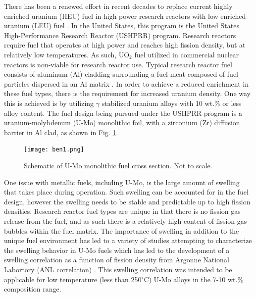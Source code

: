 \documentclass[review]{elsarticle}
\begin{document}
There has been a renewed effort in recent decades to replace current highly enriched uranium (HEU) fuel in high power research reactors with low enriched uranium (LEU) fuel \cite{snelgrove1997}. In the United States, this program is the United States High-Performance Research Reactor (USHPRR) program. Research reactors require fuel that operates at high power and reaches high fission density, but at relatively low temperatures. As such, UO$_{2}$ fuel utilized in commercial nuclear reactors is non-viable for research reactor use. Typical research reactor fuel consists of aluminum (Al) cladding surrounding a fuel meat composed of fuel particles dispersed in an Al matrix \cite{meyer2014}. In order to achieve a reduced enrichment in these fuel types, there is the requirement for increased uranium density. One way this is achieved is by utilizing $\gamma$ stabilized uranium alloys with 10 wt.\% or less alloy content. The fuel design being pursued under the USHPRR program is a uranium-molybdenum (U-Mo) monolithic foil, with a zirconium (Zr) diffusion barrier in Al clad, as shown in Fig. \ref{fig:ben1}. 

\begin{figure}[!h]
 \centering
 \texttt{[image: ben1.png]} 
 \caption{Schematic of U-Mo monolithic fuel cross section. Not to scale.}
 \label{fig:ben1}
\end{figure}

\FloatBarrier

One issue with metallic fuels, including U-Mo, is the large amount of swelling that takes place during operation\cite{hofman1997}. Such swelling can be accounted for in the fuel design, however the swelling needs to be stable and predictable up to high fission densities. Research reactor fuel types are unique in that there is no fission gas release from the fuel, and as such there is a relatively high content of fission gas bubbles within the fuel matrix. The importance of swelling in addition to the unique fuel environment has led to a variety of studies attempting to characterize the swelling behavior in U-Mo fuels \cite{rest2009, kim_anl08, meyer2002, kim2013} which has led to the development of a swelling correlation as a function of fission density from Argonne National Labortory (ANL correlation) \cite{kim2011}. This swelling correlation was intended to be applicable for low temperature (less than 250$^{\circ}$C) U-Mo alloys in the 7-10 wt.\% composition range. 
\end{document}
